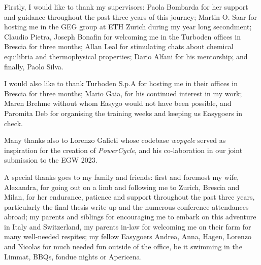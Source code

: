 Firstly, I would like to thank my supervisors: Paola Bombarda for her support and guidance throughout the past three years of this journey; Martin O. Saar for hosting me in the GEG group at ETH Zurich during my year long secondment; Claudio Pietra, Joseph Bonafin for welcoming me in the Turboden offices in Brescia for three months; Allan Leal for stimulating chats about chemical equilibria and thermophysical properties; Dario Alfani for his mentorship; and finally, Paolo Silva. 

I would also like to thank Turboden S.p.A for hosting me in their offices in Brescia for three months; Mario Gaia, for his continued interest in my work; Maren Brehme without whom Easygo would not have been possible, and Paromita Deb for organising the training weeks and keeping us Easygoers in check.

Many thanks also to Lorenzo Galieti whose codebase \emph{wopycle} served as inspiration for the creation of \emph{PowerCycle}, and his co-laboration in our joint submission to the EGW 2023. 

A special thanks goes to my family and friends: first and foremost my wife, Alexandra, for going out on a limb and following me to Zurich, Brescia and Milan, for her endurance, patience and support throughout the past three years, particularly the final thesis write-up and the numerous conference attendances abroad; my parents and siblings for encouraging me to embark on this adventure in Italy and Switzerland, my parents in-law for welcoming me on their farm for many well-needed respites; my fellow Easygoers Andrea, Anna, Hagen, Lorenzo and Nicolas for much needed fun outside of the office, be it swimming in the Limmat, BBQs, fondue nights or Apericena.    